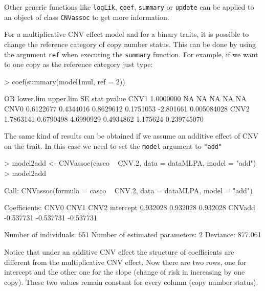 \documentclass[11pt]{article}
\begin{document}
%
Other generic functions like {\tt logLik}, {\tt coef}, {\tt summary} or {\tt update} can be applied to an object of class {\tt CNVassoc} 
to get more information.

For a multiplicative CNV effect model and for a binary traits, it is possible to change the reference category of copy number status. 
This can be done by using the argument \texttt{ref} when executing the \texttt{summary} function. For example, if we want to one copy 
as the reference category just type:


\begin{Schunk}
\begin{Sinput}
> coef(summary(model1mul, ref = 2))
\end{Sinput}
\begin{Soutput}
            OR lower.lim upper.lim        SE      stat      pvalue
CNV1 1.0000000        NA        NA        NA        NA          NA
CNV0 0.6122677 0.4344016 0.8629612 0.1751053 -2.801661 0.005084028
CNV2 1.7863141 0.6790498 4.6990929 0.4934862  1.175624 0.239745070
\end{Soutput}
\end{Schunk}



The same kind of results can be obtained if we assume an additive effect of CNV on the trait. In this case we need to set the 
{\tt model} argument to {\tt "add"}


\begin{Schunk}
\begin{Sinput}
> model2add <- CNVassoc(casco ~ CNV.2, data = dataMLPA, model = "add")
> model2add
\end{Sinput}
\begin{Soutput}
Call:  CNVassoc(formula = casco ~ CNV.2, data = dataMLPA, model = "add") 

Coefficients:
           CNV0       CNV1       CNV2     
intercept   0.932028   0.932028   0.932028
CNVadd     -0.537731  -0.537731  -0.537731

Number of individuals: 651 
Number of estimated parameters: 2 
Deviance: 877.061 
\end{Soutput}
\end{Schunk}


Notice that under an additive CNV effect the structure of coefficients are different from the multiplicative CNV effect.
Now there are two rows, one for intercept and the other one for the slope (change of risk in increasing by one copy). These two values 
remain constant for every column (copy number status).
\end{document}

